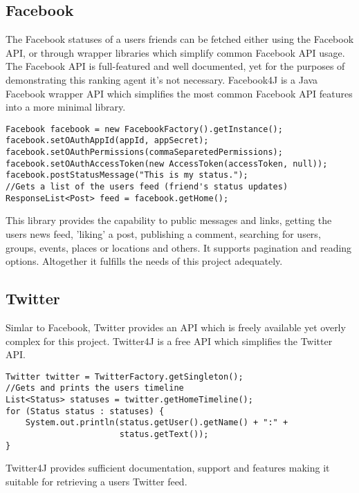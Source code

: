 \subsection{Facebook}
The Facebook statuses of a users friends can be fetched either using the Facebook API, or through wrapper libraries which simplify common Facebook API usage. The Facebook API is full-featured and well documented, yet for the purposes of demonstrating this ranking agent it's not necessary. 
Facebook4J is a Java Facebook wrapper API which simplifies the most common Facebook API features into a more minimal library. 

\begin{lstlisting}
Facebook facebook = new FacebookFactory().getInstance();
facebook.setOAuthAppId(appId, appSecret);
facebook.setOAuthPermissions(commaSeparetedPermissions);
facebook.setOAuthAccessToken(new AccessToken(accessToken, null));
facebook.postStatusMessage("This is my status.");
//Gets a list of the users feed (friend's status updates)
ResponseList<Post> feed = facebook.getHome();
\end{lstlisting}


This library provides the capability to public messages and links, getting the users news feed, 'liking' a post, publishing a comment, searching for users, groups, events, places or locations and others. It supports pagination and reading options. Altogether it fulfills the needs of this project adequately. 

\subsection{Twitter}

Simlar to Facebook, Twitter provides an API which is freely available yet overly complex for this project. Twitter4J is a free API which simplifies the Twitter API.

\begin{lstlisting}
Twitter twitter = TwitterFactory.getSingleton();
//Gets and prints the users timeline
List<Status> statuses = twitter.getHomeTimeline();
for (Status status : statuses) {
    System.out.println(status.getUser().getName() + ":" +
                       status.getText());
}
\end{lstlisting}

Twitter4J provides sufficient documentation, support and features making it suitable for retrieving a users Twitter feed.  


